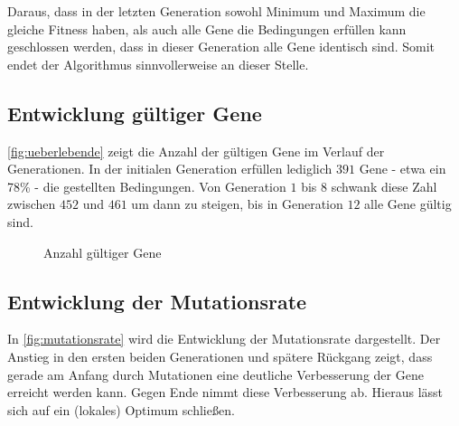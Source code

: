 Daraus, dass in der letzten Generation sowohl Minimum und Maximum die gleiche Fitness haben,
als auch alle Gene die Bedingungen erfüllen kann geschlossen werden, dass in dieser Generation alle Gene identisch sind.
Somit endet der Algorithmus sinnvollerweise an dieser Stelle.

\subsection{Entwicklung gültiger Gene}

\autoref{fig:ueberlebende} zeigt die Anzahl der gültigen Gene im Verlauf der Generationen.
In der initialen Generation erfüllen lediglich $391$ Gene - etwa ein 78\% - die gestellten Bedingungen.
Von Generation $1$ bis $8$ schwank diese Zahl zwischen $452$ und $461$ um dann zu steigen,
 bis in Generation $12$ alle Gene gültig sind.

\begin{figure}[ht]
    \centering
	\caption{Anzahl gültiger Gene}
	\label{fig:ueberlebende}
\end{figure}

\newpage
\subsection{Entwicklung der Mutationsrate}

In \autoref{fig:mutationsrate} wird die Entwicklung der Mutationsrate dargestellt.
Der Anstieg in den ersten beiden Generationen und spätere Rückgang zeigt,
dass gerade am Anfang durch Mutationen eine deutliche Verbesserung der Gene erreicht werden kann.
Gegen Ende nimmt diese Verbesserung ab. Hieraus lässt sich auf ein (lokales) Optimum schließen.

